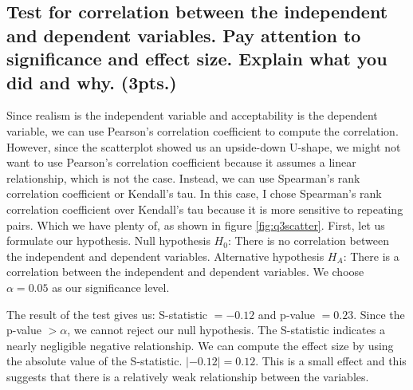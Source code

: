 \documentclass[a4paper]{article}
\begin{document}
\subsection{Test for correlation between the independent and dependent variables. Pay attention to significance and effect size. Explain what you did and why. (3pts.)}
Since realism is the independent variable and acceptability is the dependent variable, we can use Pearson's correlation coefficient to compute the correlation. However, since the scatterplot showed us an upside-down U-shape, we might not want to use Pearson's correlation coefficient because it assumes a linear relationship, which is not the case. Instead, we can use Spearman's rank correlation coefficient or Kendall's tau. In this case, I chose Spearman's rank correlation coefficient over Kendall's tau because it is more sensitive to repeating pairs. Which we have plenty of, as shown in figure \ref{fig:q3scatter}. First, let us formulate our hypothesis. \newline\newline
Null hypothesis $H_0$: There is no correlation between the independent and dependent variables.  \newline
Alternative hypothesis $H_A$: There is a correlation between the independent and dependent variables. \newline
We choose $\alpha = 0.05$ as our significance level. \newline\newline
{}
The result of the test gives us: S-statistic $= -0.12$ and p-value $= 0.23$. Since the p-value $> \alpha$, we cannot reject our null hypothesis. The S-statistic indicates a nearly negligible negative relationship. We can compute the effect size by using the absolute value of the S-statistic. $|-0.12| = 0.12$. This is a small effect and this suggests that there is a relatively weak relationship between the variables.
\end{document}
